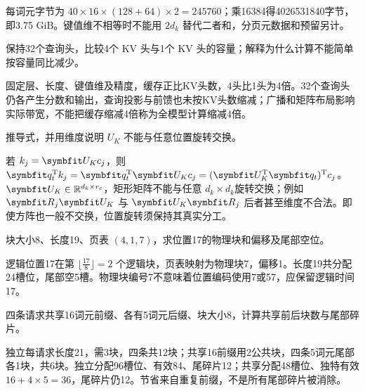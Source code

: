 \begin{exercises}
\begin{exercise}
\begin{solution}
每词元字节为 $40\times16\times(128+64)\times2=245760$；乘16384得4026531840字节，即3.75 GiB。键值维不相等时不能用 $2d_k$ 替代二者和，分页元数据和预留另计。
\end{solution}
\end{exercise}

\begin{exercise} 保持32个查询头，比较4个 KV 头与1个 KV 头的容量；解释为什么计算不能简单按容量同比减少。

\begin{solution}
固定层、长度、键值维及精度，缓存正比KV头数，4头比1头为4倍。32个查询头仍各产生分数和输出，查询投影与前馈也未按KV头数缩减；广播和矩阵布局影响实际带宽，不能把缓存缩减4倍称为全模型计算缩减4倍。
\end{solution}
\end{exercise}

\begin{exercise}\optional 推导式，并用维度说明 $U_K$ 不能与任意位置旋转交换。

\begin{solution}
若 $k_j=\mat{U}_Kc_j$，则 $\vect{q}_t^{\mathrm{T}}k_j=\vect{q}_t^{\mathrm{T}}\mat{U}_Kc_j=(\mat{U}_K^{\mathrm{T}}\vect{q}_t)^{\mathrm{T}}c_j$。$\mat{U}_K\in\mathbb R^{d_k\times r_c}$，矩形矩阵不能与任意 $d_k\times d_k$旋转交换；例如 $\mat{R}_j\mat{U}_K$ 与 $\mat{U}_K\mat{R}_j$ 后者甚至维度不合法。即使方阵也一般不交换，位置旋转须保持其真实分工。
\end{solution}
\end{exercise}

\begin{exercise} 块大小8、长度19、页表 $(4,1,7)$，求位置17的物理块和偏移及尾部空位。

\begin{solution}
逻辑位置17在第 $\lfloor\frac{17}{8}\rfloor=2$ 个逻辑块，页表映射为物理块7，偏移1。长度19共分配24槽位，尾部空5槽。物理块编号7不意味着位置编码使用7或57，应保留逻辑时间17。
\end{solution}
\end{exercise}

\begin{exercise} 四条请求共享16词元前缀、各有5词元后缀、块大小8，计算共享前后块数与尾部碎片。

\begin{solution}
独立每请求长度21，需3块，四条共12块；共享16前缀用2公共块，四条5词元尾部各1块，共6块。独立分配96槽位、有效84、尾碎片12；共享分配48槽位、独特有效 $16+4\times5=36$，尾碎片仍12。节省来自重复前缀，不是所有尾部碎片被消除。
\end{solution}
\end{exercise}


\end{exercises}
